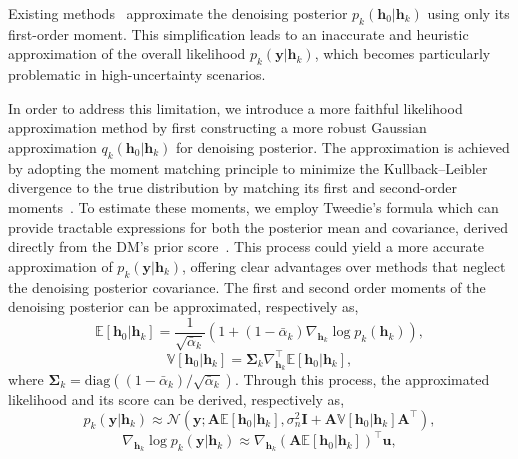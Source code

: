 \documentclass[lettersize,journal]{IEEEtran}
\begin{document}
Existing methods~\cite{arvinteMIMOChannelEstimation2023,zhouGenerativeDiffusionModels2025} approximate the denoising posterior $p_{k}(\mathbf{h}_{0}|\mathbf{h}_{k})$ using only its first-order moment. This simplification leads to an inaccurate and heuristic approximation of the overall likelihood $p_{k}(\mathbf{y}|\mathbf{h}_{k})$, which becomes particularly problematic in high-uncertainty scenarios.

In order to address this limitation, we introduce a more faithful likelihood approximation method by first constructing a more robust Gaussian approximation $q_{k}(\mathbf{h}_{0}|\mathbf{h}_{k})$ for denoising posterior. The approximation is achieved by adopting the moment matching principle to minimize the Kullback–Leibler divergence to the true distribution by matching its first and second-order moments~\cite{bishopPatternRecognitionMachine2006}. To estimate these moments, we employ Tweedie's formula which can provide tractable expressions for both the posterior mean and covariance, derived directly from the DM's prior score~\cite{efronTweediesFormulaSelection2011}. This process could yield a more accurate approximation of $p_{k}(\mathbf{y}|\mathbf{h}_{k})$, offering clear advantages over methods that neglect the denoising posterior covariance. The first and second order moments of the denoising posterior can be approximated, respectively as,
\begin{equation}
\label{eq:first_moment}
\mathbb{E}[\mathbf{h}_{0}|\mathbf{h}_{k}] = \frac{1}{\sqrt{ \bar{\alpha}_{k} }}(1+(1-\bar{\alpha}_{k})\nabla_{\mathbf{h}_{k}}\log p_{k}(\mathbf{h}_{k})),
\end{equation}
\begin{equation}
\label{eq:second_moment}
\mathbb{V}[\mathbf{h}_{0}|\mathbf{h}_{k}] = \boldsymbol{\Sigma}_{k}\nabla_{\mathbf{h}_{k}}^{\top}\mathbb{E}[\mathbf{h}_{0}|\mathbf{h}_{k}],
\end{equation}
where $\boldsymbol{\Sigma}_{k} = \text{diag}((1-\bar{\alpha}_{k}) / \sqrt{ \bar{\alpha}_{k} })$. Through this process, the approximated likelihood and its score can be derived, respectively as,
\begin{equation}
\label{eq:likelihood_approx}
p_{k}(\mathbf{y}|\mathbf{h}_{k}) \approx \mathcal{N}(\mathbf{y}; \mathbf{A}\mathbb{E}[\mathbf{h}_{0}|\mathbf{h}_{k}], \sigma_{n}^{2}\mathbf{I}+\mathbf{A}\mathbb{V}[\mathbf{h}_{0}|\mathbf{h}_{k}]\mathbf{A}^{\top}),
\end{equation}
\begin{equation}
\label{eq:likelihood_score_approx}
\nabla_{\mathbf{h}_{k}}\log p_{k}(\mathbf{y}|\mathbf{h}_{k}) \approx \nabla_{\mathbf{h}_{k}} (\mathbf{A}\mathbb{E}[\mathbf{h}_{0}|\mathbf{h}_{k}])^{\top}\mathbf{u},
\end{equation}
\end{document}
